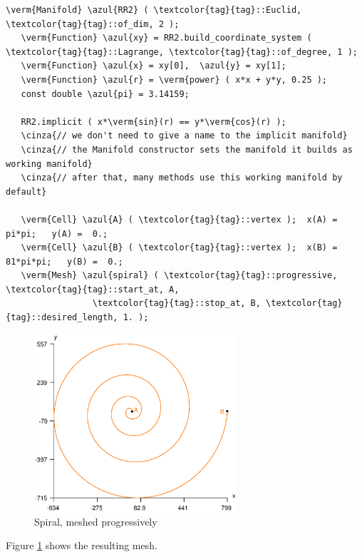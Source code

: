 \begin{Verbatim}[commandchars=\\\{\},formatcom=\small\tt,frame=single,
   label=parag-\ref{\numb section 3.\numb parag 5}.cpp,rulecolor=\color{coment},
   baselinestretch=0.94,framesep=2mm                                            ]
   \verm{Manifold} \azul{RR2} ( \textcolor{tag}{tag}::Euclid, \textcolor{tag}{tag}::of_dim, 2 );
   \verm{Function} \azul{xy} = RR2.build_coordinate_system ( \textcolor{tag}{tag}::Lagrange, \textcolor{tag}{tag}::of_degree, 1 );
   \verm{Function} \azul{x} = xy[0],  \azul{y} = xy[1];
   \verm{Function} \azul{r} = \verm{power} ( x*x + y*y, 0.25 );
   const double \azul{pi} = 3.14159;
   
   RR2.implicit ( x*\verm{sin}(r) == y*\verm{cos}(r) );
   \cinza{// we don't need to give a name to the implicit manifold}
   \cinza{// the Manifold constructor sets the manifold it builds as working manifold}
   \cinza{// after that, many methods use this working manifold by default}
   
   \verm{Cell} \azul{A} ( \textcolor{tag}{tag}::vertex );  x(A) =    pi*pi;   y(A) =  0.;
   \verm{Cell} \azul{B} ( \textcolor{tag}{tag}::vertex );  x(B) = 81*pi*pi;   y(B) =  0.;
   \verm{Mesh} \azul{spiral} ( \textcolor{tag}{tag}::progressive, \textcolor{tag}{tag}::start_at, A,
                 \textcolor{tag}{tag}::stop_at, B, \textcolor{tag}{tag}::desired_length, 1. );
\end{Verbatim}

\begin{figure} \centering
 \includegraphics[width=75mm]{spiral-prog}
  \caption{Spiral, meshed progressively}
 \label{\numb section 3.\numb fig 3}
\end{figure}

Figure \ref{\numb section 3.\numb fig 3} shows the resulting mesh.

